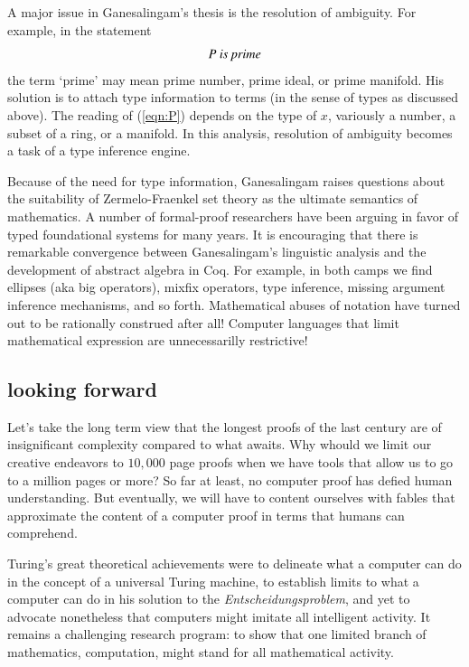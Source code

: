 \documentclass{llncs}
\begin{document}
A major issue in Ganesalingam's thesis is the resolution of ambiguity.
For example, in the statement
\begin{equation}\label{eqn:P}
P \text{\it ~is prime}
\end{equation}
 the term `prime' may mean prime number, prime ideal, or prime
manifold.  His solution is to attach type information to terms (in the
sense of types as discussed above).  The reading of (\ref{eqn:P})
depends on the type of $x$, variously a number, a subset of a ring, or a
manifold.  In this analysis, resolution of ambiguity becomes a task of
a type inference engine.  

Because of the need for type information, Ganesalingam raises
questions about the suitability of Zermelo-Fraenkel set theory as the
ultimate semantics of mathematics.  A number of formal-proof
researchers have been arguing in favor of typed foundational systems
for many years.  It is encouraging that there is  remarkable
convergence between Ganesalingam's linguistic analysis and
the development of abstract algebra in Coq. For example, in both
camps we find ellipses (aka big operators), mixfix operators, type
inference, missing argument inference mechanisms, and so forth.
Mathematical abuses of notation have turned out to be rationally construed after all!
Computer languages that limit mathematical expression are unnecessarilly restrictive!



\subsection{looking forward}

Let's take the long term view that the longest proofs of the last century 
are of insignificant complexity compared to what awaits.
Why whould we limit our creative endeavors to $10,000$ page proofs when we have tools
that allow us to go to a million pages or more?  So far at least, no computer proof
has defied human understanding.  But eventually, we will have to content ourselves
with fables that approximate the content of a computer proof in terms that humans
can comprehend.


Turing's great theoretical achievements were to delineate what a
computer can do in the concept of a universal Turing machine, to
establish limits to what a computer can do in his solution to the {\it
  Entscheidungsproblem}, and yet to advocate nonetheless that
computers might imitate all intelligent activity. It remains a
challenging research program:
to show
that one limited branch of mathematics, computation, might stand for
all mathematical activity.
\end{document}
